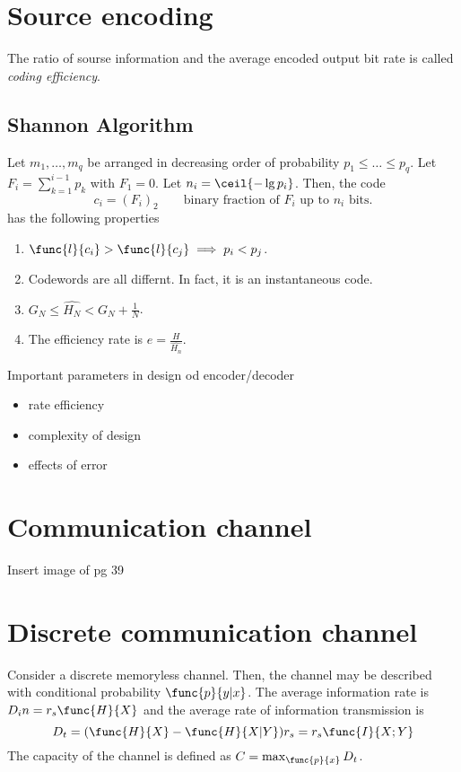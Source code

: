 \section{Source encoding}
\begin{definition}
    The ratio of sourse information and the average encoded output bit rate is called \textit{coding efficiency}.
\end{definition}
\subsection{Shannon Algorithm}
Let \(m_1,\dots,m_q\) be arranged in decreasing order of probability \(p_1 \leq \dots \leq p_q\). Let \(F_i = \sum_{k = 1}^{i - 1} p_k\) with \(F_1 = 0\). Let \(n_i = \ceil{-\lg p_i}\). Then, the code 
\begin{equation*}
    c_i = (F_i)_2 \qquad \text{binary fraction of \(F_i\) up to \(n_i\) bits.}
\end{equation*}
has the following properties 
\begin{enumerate}
    \item \(\func{l}{c_i} > \func{l}{c_j} \implies p_i < p_j\).
    \item Codewords are all differnt. In fact, it is an instantaneous code.
    \item \(G_N \leq \hat{H_N} < G_N + \frac{1}{N}\).
    \item The efficiency rate is \(e = \frac{H}{\hat{H_n}}\).
\end{enumerate}
Important parameters in design od encoder/decoder 
\begin{itemize}
    \item rate efficiency
    \item complexity of design
    \item effects of error
\end{itemize}
\section{Communication channel}
Insert image of pg 39
\section{Discrete communication channel}
Consider a discrete memoryless channel. Then, the channel may be described with conditional probability \(\func{p}{y|x}\). The average information rate is \(D_in = r_s \func{H}{X} \) and the average rate of information transmission is 
\begin{equation*}
    D_t = (\func{H}{X} - \func{H}{X|Y}) r_s = r_s \func{I}{X;Y}
\end{equation*}
The capacity of the channel is defined as \(C = \max_{\func{p}{x}} D_t\).

